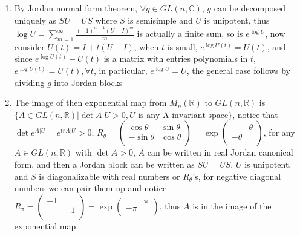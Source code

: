 \documentclass[main]{subfiles}
\begin{document}
\begin{solution}
\begin{enumerate}[label=(\alph*),leftmargin=*]
\item By Jordan normal form theorem, $\forall g\in GL(n,\mathbb{C})$, $g$ can be decomposed uniquely as $SU=US$ where $S$ is semisimple and $U$ is unipotent, thus $\displaystyle\log U=\sum_{m=1}^{\infty}\frac{(-1)^{m+1}(U-I)^m}{m}$ is actually a finite sum, so is $e^{\log U}$, now consider $U(t)=I+t(U-I)$, when $t$ is small, $e^{\log U(t)}=U(t)$, and since $e^{\log U(t)}-U(t)$ is a matrix with entries polynomials in $t$, $e^{\log U(t)}=U(t), \forall t$, in particular, $e^{\log U}=U$, the general case follows by dividing $g$ into Jordan blocks 
\item The image of then exponential map from  $M_n(\mathbb{R})$ to $GL(n,\mathbb{R})$ is $\{A\in GL(n,\mathbb{R})|\det A|U>0, U \text{ is any A invariant space}\}$, notice that $\det e^{A|U}=e^{trA|U}>0$, $R_\theta=\left( {\begin{array}{cc}
   \cos\theta & \sin\theta \\
   -\sin\theta & \cos\theta \\
  \end{array} } \right)=\exp\left( {\begin{array}{cc}
    & \theta \\
   -\theta &  \\
  \end{array} } \right)$, for any $A\in GL(n,\mathbb{R})$ with $\det A>0$, $A$ can be written in real Jordan canonical form, and then a Jordan block can be written as $SU=US$, $U$ is unipotent, and $S$ is diagonalizable with real numbers or $R_\theta$'s, for negative diagonal numbers we can pair them up and notice $R_\pi=\left( {\begin{array}{cc}
   -1 &  \\
    & -1 \\
  \end{array} } \right)=\exp\left( {\begin{array}{cc}
    & \pi \\
   -\pi &  \\
  \end{array} } \right)$, thus $A$ is in the image of the exponential map
\end{enumerate}
\end{solution}
\end{document}
